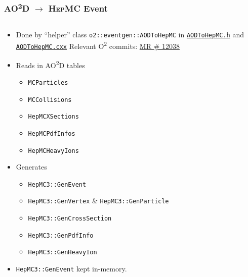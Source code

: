 \documentclass[compress,table,8pt]{beamer}
\newcommand\HepMC{{\scshape HepMC}}
\newcommand\Otwo{O\textsuperscript{2}}
\newcommand\AOD{AO\textsuperscript{2}D}
\begin{document}
\begin{frame}
  \frametitle{\AOD{} $\rightarrow$ \HepMC{} Event}

  \begin{columns}[onlytextwidth,t]
    \begin{column}{.4\linewidth}
      \begin{itemize}
      \item<+-> Done by ``helper'' class
        \texttt{o2::eventgen::AODToHepMC} in
        \href{https://github.com/AliceO2Group/AliceO2/blob/dev/Generators/include/Generators/AODToHepMC.h}{\texttt{AODToHepMC.h}}
        and
        \href{https://github.com/AliceO2Group/AliceO2/blob/dev/Generators/src/AODToHepMC.cxx}{\texttt{AODToHepMC.cxx}}
        \newline%
        {\footnotesize Relevant \Otwo{} commits:
          \href{https://github.com/AliceO2Group/AliceO2/pull/12038/commits}{MR
            \# 12038}}
      \item<+-> Reads in \AOD{} tables
        \begin{itemize}
        \item \texttt{MCParticles}
        \item \texttt{MCCollisions}
        \item \texttt{HepMCXSections}
        \item \texttt{HepMCPdfInfos}
        \item \texttt{HepMCHeavyIons}
        \end{itemize}
      \item<+-> Generates
        \begin{itemize}
        \item \texttt{HepMC3::GenEvent}
        \item \texttt{HepMC3::GenVertex} \& \texttt{HepMC3::GenParticle}
        \item \texttt{HepMC3::GenCrossSection}
        \item \texttt{HepMC3::GenPdfInfo}
        \item \texttt{HepMC3::GenHeavyIon}
        \end{itemize}
      \item<+-> \texttt{HepMC3::GenEvent} kept in-memory.
      \end{itemize}
    \end{column}
    \begin{column}{.55\linewidth}
      \begin{center}
        \begin{tikzpicture}

\end{tikzpicture}
\end{center}
\end{column}
\end{columns}
\end{frame}
\end{document}

